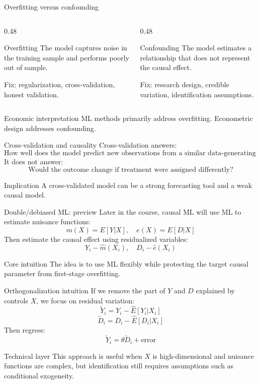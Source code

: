 \documentclass[aspectratio=169,11pt]{beamer}
\newcommand{\core}[1]{\begin{block}{Core intuition}#1\end{block}}
\newcommand{\grad}[1]{\begin{alertblock}{Technical layer}#1\end{alertblock}}
\newcommand{\econ}[1]{\begin{exampleblock}{Economic interpretation}#1\end{exampleblock}}
\begin{document}
\begin{frame}{Overfitting versus confounding}
\begin{columns}
\begin{column}{0.48\textwidth}
\begin{block}{Overfitting}
The model captures noise in the training sample and performs poorly out of sample.
\end{block}
Fix: regularization, cross-validation, honest validation.
\end{column}
\begin{column}{0.48\textwidth}
\begin{alertblock}{Confounding}
The model estimates a relationship that does not represent the causal effect.
\end{alertblock}
Fix: research design, credible variation, identification assumptions.
\end{column}
\end{columns}
\vspace{1em}
\econ{
ML methods primarily address overfitting. Econometric design addresses confounding.
}
\end{frame}

\begin{frame}{Cross-validation and causality}
Cross-validation answers:
\[
\text{How well does the model predict new observations from a similar data-generating process?}
\]
It does not answer:
\[
\text{Would the outcome change if treatment were assigned differently?}
\]
\begin{alertblock}{Implication}
A cross-validated model can be a strong forecasting tool and a weak causal model.
\end{alertblock}
\end{frame}

\begin{frame}{Double/debiased ML: preview}
Later in the course, causal ML will use ML to estimate nuisance functions:
\[
m(X)=E[Y|X], \quad e(X)=E[D|X]
\]
Then estimate the causal effect using residualized variables:
\[
Y_i-\widehat m(X_i), \quad D_i-\widehat e(X_i)
\]
\core{
The idea is to use ML flexibly while protecting the target causal parameter from first-stage overfitting.
}
\end{frame}

\begin{frame}{Orthogonalization intuition}
If we remove the part of $Y$ and $D$ explained by controls $X$, we focus on residual variation:
\[
\tilde Y_i = Y_i-\widehat E[Y_i|X_i]
\]
\[
\tilde D_i = D_i-\widehat E[D_i|X_i]
\]
Then regress:
\[
\tilde Y_i = \theta \tilde D_i + \text{error}
\]
\grad{
This approach is useful when $X$ is high-dimensional and nuisance functions are complex, but identification still requires assumptions such as conditional exogeneity.
}
\end{frame}
\end{document}
